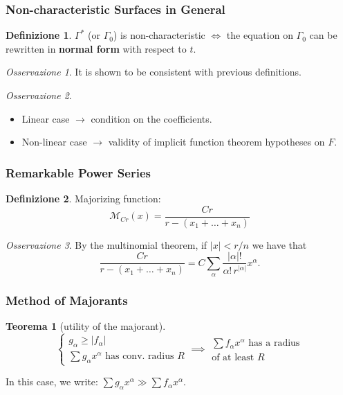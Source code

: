 \documentclass[serif,notheorems]{beamer}
\theoremstyle{definition} %
\newtheorem{theorem}{Teorema}[section] %
\newtheorem{definition}{Definizione}[section] %
\theoremstyle{remark}
\newtheorem*{remark}{Osservazione}
\begin{document}
\begin{frame}
\frametitle{Non-characteristic Surfaces in General}
\begin{definition}
$\Gamma^*$ (or $\Gamma_0$) is non-characteristic $\iff$ the equation on $\Gamma_0$ can be rewritten in \textbf{normal form} with respect to $t$.
\end{definition}
\begin{remark}
It is shown to be consistent with previous definitions.
\end{remark}
\begin{remark}
\begin{itemize}
\item Linear case $\rightarrow$ condition on the coefficients.
\item Non-linear case $\rightarrow$ validity of implicit function theorem hypotheses on $F$.
\end{itemize}
\end{remark}
\end{frame}

\begin{frame}
\frametitle{Remarkable Power Series}
\begin{definition}
Majorizing function: $$\mathcal{M}_{Cr}(x)=\frac{Cr}{r-(x_1+\ldots +x_n)}$$
\end{definition}
\begin{remark}
By the multinomial theorem, if $|x|<r/n$ we have that
$$\frac{Cr}{r-(x_1+\ldots +x_n)}=C \sum\limits_\alpha \frac{|\alpha |!}{\alpha ! \, r^{|\alpha |}} x^\alpha.$$
\end{remark}
\end{frame}

\begin{frame}
\frametitle{Method of Majorants}
\begin{theorem}[utility of the majorant]
\begin{equation*}
\begin{cases}
g_\alpha \geq |f_\alpha|\\
\sum g_\alpha x^\alpha \text{ has conv. radius } R
\end{cases}
\implies 
\begin{array}{c}
\sum f_\alpha x^\alpha 
\text{ has a radius} \\
\text{of at least } R
\end{array}
\end{equation*}
\end{theorem}
In this case, we write: $\sum g_\alpha x^\alpha \gg \sum f_\alpha x^\alpha$.
\end{frame}
\end{document}
